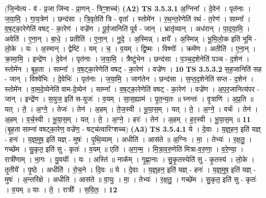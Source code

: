 \documentclass[17pt]{extarticle}
\begin{document}
                  \newline
                      (जि॒न्वेत्य - व॑ - प्र॒जा जि॑न्व - प्रा॒णन् - त्रिꣳ॒॒शच्च॑) \textbf{(A2)} \newline \newline
                                \textbf{ TS 3.5.3.1} \newline
                  अ॒ग्निना᳚ । दे॒वेन॑ । पृत॑नाः । ज॒या॒मि॒ । गा॒य॒त्रेण॑ । छन्द॑सा । त्रि॒वृतेति॑ त्रि - वृता᳚ । स्तोमे॑न । र॒थ॒न्त॒रेणेति॑ रथं - त॒रेण॑ । साम्ना᳚ । व॒ष॒ट्का॒रेणेति॑ वषट् - का॒रेण॑ । वज्रे॑ण । पू॒र्व॒जानिति॑ पूर्व - जान् । भ्रातृ॑व्यान् । अध॑रान् । पा॒द॒या॒मि॒ । अवेति॑ । ए॒ना॒न् । बा॒धे॒ । प्रतीति॑ । ए॒ना॒न् । नु॒दे॒ । अ॒स्मिन्न् । क्षये᳚ । अ॒स्मिन्न् । भू॒मि॒लो॒क इति॑ भूमि - लो॒के । यः । अ॒स्मान् । द्वेष्टि॑ । यम् । च॒ । व॒यम् । द्वि॒ष्मः । विष्णोः᳚ । क्रमे॑ण । अतीति॑ । ए॒ना॒न् । क्रा॒मा॒मि॒ । इन्द्रे॑ण । दे॒वेन॑ । पृत॑नाः । ज॒या॒मि॒ । त्रैष्टु॑भेन । छन्द॑सा । प॒ञ्च॒द॒शेनेति॑ पञ्च - द॒शेन॑ । स्तोमे॑न । बृ॒ह॒ता । साम्ना᳚ । व॒ष॒ट्का॒रेणेति॑ वषट् - का॒रेण॑ । वज्रे॑ण । \textbf{  10} \newline
                  \newline
                                \textbf{ TS 3.5.3.2} \newline
                  स॒ह॒जानिति॑ सह - जान् । विश्वे॑भिः । दे॒वेभिः॑ । पृत॑नाः । ज॒या॒मि॒ । जाग॑तेन । छन्द॑सा । स॒प्त॒द॒शेनेति॑ सप्त - द॒शेन॑ । स्तोमे॑न । वा॒म॒दे॒व्येनेति॑ वाम-दे॒व्येन॑ । साम्ना᳚ । व॒ष॒ट्का॒रेणेति॑ वषट् - का॒रेण॑ । वज्रे॑ण । अ॒प॒र॒जानित्य॑पर - जान् । इन्द्रे॑ण । स॒युज॒ इति॑ स-युजः॑ । व॒यम् । सा॒स॒ह्याम॑ । पृ॒त॒न्य॒तः ॥ घ्नन्तः॑ । वृ॒त्राणि॑ । अ॒प्र॒ति ॥ यत् । ते॒ । अ॒ग्ने॒ । तेजः॑ । तेन॑ । अ॒हम् । ते॒ज॒स्वी । भू॒या॒स॒म् । यत् । ते॒ । अ॒ग्ने॒ । वर्चः॑ । तेन॑ । अ॒हम् । व॒र्च॒स्वी । भू॒या॒स॒म् । यत् । ते॒ । अ॒ग्ने॒ । हरः॑ । तेन॑ । अ॒हम् । ह॒र॒स्वी । भू॒या॒स॒म् ॥ \textbf{  11} \newline
                  \newline
                      (बृ॒ह॒ता साम्ना॑ वषट्का॒रेण॒ वज्रे॑ण॒ - षट्च॑त्वारिꣳशच्च)  \textbf{(A3)} \newline \newline
                                \textbf{ TS 3.5.4.1} \newline
                  ये । दे॒वाः । य॒ज्ञ्॒हन॒ इति॑ यज्ञ् - हनः॑ । य॒ज्ञ्॒मुष॒ इति॑ यज्ञ् - मुषः॑ । पृ॒थि॒व्याम् । अधीति॑ । आस॑ते ॥ अ॒ग्निः । मा॒ । तेभ्यः॑ । र॒क्ष॒तु॒ । गच्छे॑म । सु॒कृत॒ इति॑ सु - कृतः॑ । व॒यम् ॥ एति॑ । अ॒ग॒न्म॒ । मि॒त्रा॒व॒रु॒णेति॑ मित्रा-व॒रु॒णा॒ । व॒रे॒ण्या॒ । रात्री॑णाम् । भा॒गः । यु॒वयोः᳚ । यः । अस्ति॑ ॥ नाक᳚म् । गृ॒ह्णा॒नाः । सु॒कृ॒तस्येति॑ सु - कृ॒तस्य॑ । लो॒के । तृ॒तीये᳚ । पृ॒ष्ठे । अधीति॑ । रो॒च॒ने । दि॒वः ॥ ये । दे॒वाः । य॒ज्ञ्॒हन॒ इति॑ यज्ञ् - हनः॑ । य॒ज्ञ्॒मुष॒ इति॑ यज्ञ् - मुषः॑ । अ॒न्तरि॑क्षे । अधीति॑ । आस॑ते ॥ वा॒युः । मा॒ । तेभ्यः॑ । र॒क्ष॒तु॒ । गच्छे॑म । सु॒कृत॒ इति॑ सु - कृतः॑ । व॒यम् ॥ याः । ते॒ । रात्रीः᳚ । स॒वि॒तः॒ । \textbf{  12} \newline
\end{document}
